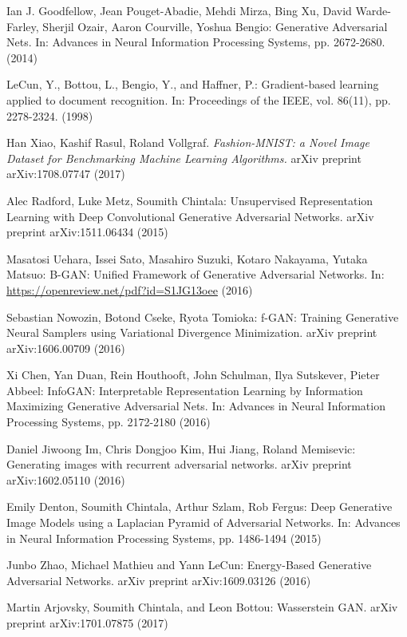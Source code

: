 \documentclass{article}
\begin{document}
\begin{thebibliography}{}

Ian J. Goodfellow, Jean Pouget-Abadie, Mehdi Mirza, Bing Xu, David Warde-Farley,
Sherjil Ozair, Aaron Courville, Yoshua Bengio: Generative Adversarial Nets. In: Advances in Neural Information Processing Systems, pp. 2672-2680. (2014)

LeCun, Y., Bottou, L., Bengio, Y., and Haffner, P.: Gradient-based learning applied to document recognition. In: Proceedings of the IEEE, vol. 86(11), pp. 2278-2324. (1998)

Han Xiao, Kashif Rasul, Roland Vollgraf. \textit{Fashion-MNIST: a Novel Image Dataset for Benchmarking Machine Learning Algorithms.}  arXiv preprint arXiv:1708.07747 (2017)

Alec Radford, Luke Metz, Soumith Chintala: Unsupervised Representation Learning with Deep Convolutional Generative Adversarial Networks. arXiv preprint arXiv:1511.06434 (2015)

Masatosi Uehara, Issei Sato, Masahiro Suzuki, Kotaro Nakayama, Yutaka Matsuo: B-GAN: Unified Framework of Generative Adversarial Networks. In: \url{https://openreview.net/pdf?id=S1JG13oee} (2016)

Sebastian Nowozin, Botond Cseke, Ryota Tomioka: f-GAN: Training Generative Neural Samplers using Variational Divergence Minimization. arXiv preprint arXiv:1606.00709 (2016)

Xi Chen, Yan Duan, Rein Houthooft, John Schulman, Ilya Sutskever, Pieter Abbeel: InfoGAN: Interpretable Representation Learning by Information Maximizing Generative Adversarial Nets. In: Advances in Neural Information Processing Systems, pp. 2172-2180 (2016)

Daniel Jiwoong Im, Chris Dongjoo Kim, Hui Jiang, Roland Memisevic: Generating images with recurrent adversarial networks. arXiv preprint arXiv:1602.05110 (2016)

Emily Denton, Soumith Chintala, Arthur Szlam, Rob Fergus: Deep Generative Image Models using a Laplacian Pyramid of Adversarial Networks. In: Advances in Neural Information Processing Systems, pp. 1486-1494 (2015)


Junbo Zhao, Michael Mathieu and Yann LeCun: Energy-Based Generative Adversarial Networks. arXiv preprint arXiv:1609.03126 (2016)

Martin Arjovsky, Soumith Chintala, and Leon Bottou: Wasserstein GAN. arXiv preprint arXiv:1701.07875 (2017)


\end{thebibliography}
\end{document}
